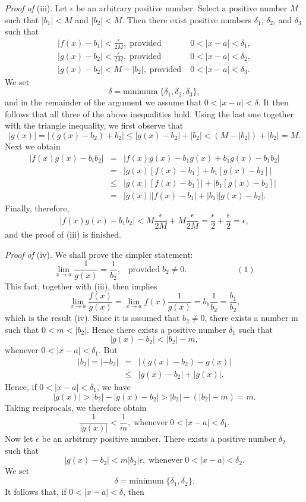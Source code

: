 \noindent \textit{Proof of} (iii). Let $\epsilon$ be an arbitrary positive number. Select a positive number $M$ such that $|b_1| < M$ and $|b_2| < M$. Then there exist positive numbers $\delta_1$, $\delta_2$, and $\delta_3$ such that
$$
\begin{array}{ll}
|f(x) - b_1| < \frac{\epsilon}{2M}, \;\mbox{provided}\; &0 < |x - a| < \delta_1, \\
|g(x) - b_2| < \frac{\epsilon}{2M}, \;\mbox{provided}\; &0 < |x - a| < \delta_2,\\
|g(x) - b_2| < M -  |b_2|,                \;\mbox{provided}\; &0 < |x - a| < \delta_3.
\end{array}
$$
We set
$$
\delta = \mbox{minimum}\; \{ \delta_1, \delta_2, \delta_3 \},
$$
and in the remainder of the argument we assume that $0 < |x - a| < \delta$. It then follows that all three of the above inequalities hold. Using the last one together with the triangle inequality, we first observe that
$$
|g(x)| = |(g(x) - b_2) + b_2| \leq |g(x) - b_2| + |b_2| < (M - |b_2|) + |b_2| = M.
$$
Next we obtain
\begin{eqnarray*}
|f(x)g(x) - b_ib_2| 
&=& | f(x)g(x) - b_1g(x) + b_1g(x) - b_1b_2 | \\
&=& | g(x)[f(x) - b_1] + b_1[g(x) - b_2] | \\
&\leq& | g(x) [f(x) - b_1] | + |b_1[g(x) - b_2] | \\
&=& | g(x)| |f(x) - b_1| + | b_1| |g(x) - b_2 |. 
\end{eqnarray*}
Finally, therefore,
$$
|f(x)g(x) - b_1b_2| < M \frac{\epsilon}{2M} + M \frac{\epsilon}{2M} = \frac{\epsilon}{2} + \frac{\epsilon}{2} = \epsilon ,
$$
and the proof of (iii) is finished.
\medskip

\noindent \textit{Proof of} (iv). We shall prove the simpler statement:
$$
\lim_{x \rightarrow a} \frac{1}{g(x)} = \frac{1}{b_2}, \;\;\;\mbox{provided}\; b_2 \neq 0. \hspace{1in} ( 1 )
$$
This fact, together with (iii), then implies 
$$
\lim_{x \rightarrow a} \frac{f(x)}{g(x)} = \lim_{x \rightarrow a} f(x) \frac{1}{g(x)} = b_1 \frac{1}{b_2} = \frac{b_1}{b_2} ,
$$
which is the result (iv). Since it is assumed that $b_2 \neq 0$, there exists a number m such that $0 < m < |b_2|$. Hence there exists a positive number $\delta_1$ such that
$$
|g(x) - b_2| < |b_2| - m,
$$
whenever $0 < |x - a| < \delta_1$. But 
\begin{eqnarray*}
|b_2| = |-b_2| &=& |(g(x) - b_2) - g(x)| \\
                         &\leq& |g(x) - b_2| + |g(x)| .
\end{eqnarray*}
Hence, if $0 < |x - a| < \delta_1$, we have 
$$
|g(x)| > |b_2| - |g(x) - b_2| > |b_2| - (|b_2| - m) = m .
$$
Taking reciprocals, we therefore obtain
$$
\frac{1}{|g(x)|} < \frac{1}{m}, \;\mbox{whenever}\; 0 < |x - a| < \delta_1.
$$
Now let $\epsilon$ be an arbitrary positive number. There exists a positive number $\delta_2$ such that
$$
|g(x) - b_2| < m |b_2| \epsilon, \;\mbox{whenever}\; 0 < |x - a| < \delta_2.
$$
We set
$$
\delta = \mbox{minimum}\; \{ \delta_1, \delta_2 \}.
$$
It follows that, if $0 < |x - a| < \delta$, then


